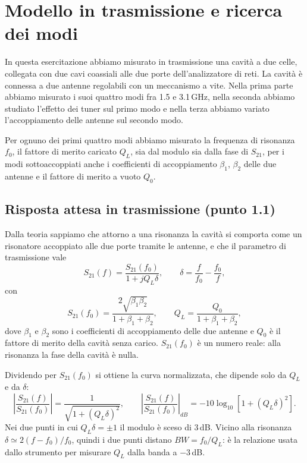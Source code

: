 \documentclass[11pt,a4paper,oneside]{book}
\begin{document}


\frontmatter
\tableofcontents

\mainmatter

\chapter{Modello in trasmissione e ricerca dei modi}

In questa esercitazione abbiamo misurato in trasmissione una cavità a due celle, collegata con due cavi coassiali alle due porte dell'analizzatore di reti. La cavità è connessa a due antenne regolabili con un meccanismo a vite. Nella prima parte abbiamo misurato i suoi quattro modi fra 1.5 e 3.1\,GHz, nella seconda abbiamo studiato l'effetto dei tuner sul primo modo e nella terza abbiamo variato l'accoppiamento delle antenne sul secondo modo.

Per ognuno dei primi quattro modi abbiamo misurato la frequenza di risonanza $f_0$, il fattore di merito caricato $Q_L$, sia dal modulo sia dalla fase di $S_{21}$, per i modi sottoaccoppiati anche i coefficienti di accoppiamento $\beta_1$, $\beta_2$ delle due antenne e il fattore di merito a vuoto $Q_0$.

\section{Risposta attesa in trasmissione (punto 1.1)}
Dalla teoria sappiamo che attorno a una risonanza la cavità si comporta come un risonatore accoppiato alle due porte tramite le antenne, e che il parametro di trasmissione vale
\begin{equation}
S_{21}(f)=\frac{S_{21}(f_0)}{1+jQ_L\delta},\qquad \delta=\frac{f}{f_0}-\frac{f_0}{f},
\label{eq:S21}
\end{equation}
con
\begin{equation}
S_{21}(f_0)=\frac{2\sqrt{\beta_1\beta_2}}{1+\beta_1+\beta_2},\qquad Q_L=\frac{Q_0}{1+\beta_1+\beta_2},
\label{eq:S21f0}
\end{equation}
dove $\beta_1$ e $\beta_2$ sono i coefficienti di accoppiamento delle due antenne e $Q_0$ è il fattore di merito della cavità senza carico. $S_{21}(f_0)$ è un numero reale: alla risonanza la fase della cavità è nulla.

Dividendo per $S_{21}(f_0)$ si ottiene la curva normalizzata, che dipende solo da $Q_L$ e da $\delta$:
\begin{equation}
\left|\frac{S_{21}(f)}{S_{21}(f_0)}\right|=\frac{1}{\sqrt{1+(Q_L\delta)^2}},\qquad
\left|\frac{S_{21}(f)}{S_{21}(f_0)}\right|_{dB}=-10\log_{10}\left[1+(Q_L\delta)^2\right].
\label{eq:S21norm}
\end{equation}
Nei due punti in cui $Q_L\delta=\pm1$ il modulo è sceso di 3\,dB. Vicino alla risonanza $\delta\simeq 2(f-f_0)/f_0$, quindi i due punti distano $BW=f_0/Q_L$: è la relazione usata dallo strumento per misurare $Q_L$ dalla banda a $-3$\,dB.
\end{document}

